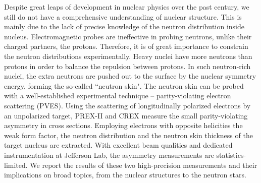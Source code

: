Despite great leaps of development in nuclear physics over the past century, 
we still do not have a comprehensive understanding of nuclear structure. This 
is mainly due to the lack of precise knowledge of the neutron distribution inside nucleus. 
Electromagnetic probes are ineffective in probing neutrons, unlike their charged partners, 
the protons. Therefore, it is of great importance to constrain the neutron distributions experimentally. 
Heavy nuclei have more neutrons than protons in order to balance the repulsion between protons. 
In such neutron-rich nuclei, the extra neutrons are pushed out to the surface 
by the nuclear symmetry energy, forming the so-called ``neutron skin". 
The neutron skin can be probed with a well-established experimental technique 
-- parity-violating electron scattering (PVES). Using the scattering of 
longitudinally polarized electrons by an unpolarized target, PREX-II and CREX 
measure the small parity-violating asymmetry in cross sections. Employing 
electrons with opposite helicities the weak form factor, the neutron distribution 
and the neutron skin thickness of the target nucleus are extracted. 
With excellent beam qualities and dedicated instrumentation at Jefferson Lab, 
the asymmetry measurements are statistics-limited. We report the results of these 
two high-precision measurements and their implications on broad topics, 
from the nuclear structures to the neutron stars.
